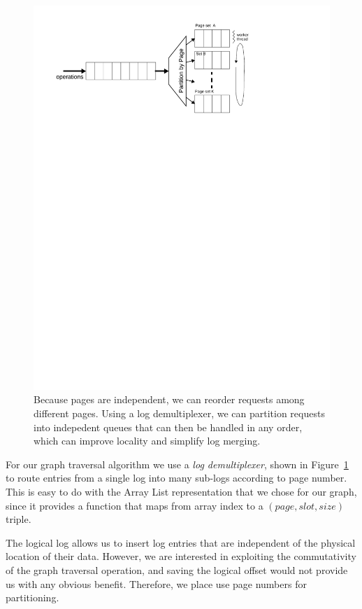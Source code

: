 \documentclass[10pt,letterpaper,twocolumn,english]{article}
\begin{document}
\begin{figure}
\includegraphics[width=1\columnwidth]{graph-traversal.pdf}
\caption{\sf\label{fig:multiplexor} Because pages are independent, we can reorder requests among different pages. Using a log demultiplexer, we can partition requests into indepedent queues that can then be handled in any order, which can improve locality and simplify log merging.}
\end{figure}

For our graph traversal algorithm we use a {\em log demultiplexer},
shown in Figure~\ref{fig:multiplexor} to route entries from a single
log into many sub-logs according to page number.  This is easy to do
with the Array List representation that we chose for our graph, since
it provides a function that maps from
array index to a $(page, slot, size)$ triple.

The logical log allows us to insert log entries that are independent
of the physical location of their data.  However, we are
interested in exploiting the commutativity of the graph traversal
operation, and saving the logical offset would not provide us with any
obvious benefit.  Therefore, we place use page numbers for partitioning.
\end{document}
